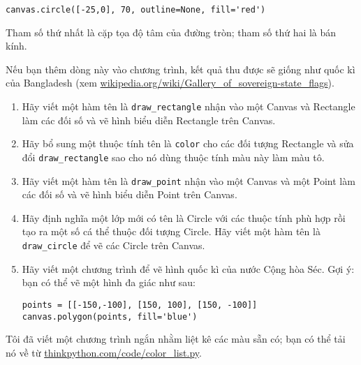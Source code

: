 \documentclass[11pt]{book}
\begin{document}
\begin{ex}
\beforeverb
\begin{verbatim}
canvas.circle([-25,0], 70, outline=None, fill='red')
\end{verbatim}
\afterverb


Tham số thứ nhất là cặp tọa độ tâm của đường tròn;
tham số thứ hai là bán kính.

Nếu bạn thêm dòng này vào chương trình, kết quả thu được sẽ giống
như quốc kì của Bangladesh
(xem \url{wikipedia.org/wiki/Gallery_of_sovereign-state_flags}).

\begin{enumerate}

\item Hãy viết một hàm tên là \verb"draw_rectangle" nhận vào một
  Canvas và Rectangle làm các đối số và vẽ hình biểu diễn
  Rectangle trên Canvas.

\item Hãy bổ sung một thuộc tính tên là {\tt color} cho các đối tượng Rectangle và
  sửa đổi \verb"draw_rectangle" sao cho nó dùng thuộc tính màu này làm màu tô.

\item Hãy viết một hàm tên là \verb"draw_point" nhận vào một 
  Canvas và một Point làm các đối số và vẽ hình biểu diễn
  Point trên Canvas.

\item Hãy định nghĩa một lớp mới có tên là Circle với các thuộc tính phù hợp rồi
  tạo ra một số cá thể thuộc đối tượng Circle. Hãy viết một hàm tên là
  \verb"draw_circle" để vẽ các Circle trên Canvas.


\item Hãy viết một chương trình để vẽ hình quốc kì của nước Cộng hòa Séc.
  Gợi ý: bạn có thể vẽ một hình đa giác như sau:

\beforeverb
\begin{verbatim}
points = [[-150,-100], [150, 100], [150, -100]]
canvas.polygon(points, fill='blue')
\end{verbatim}
\afterverb

\end{enumerate}


Tôi đã viết một chương trình ngắn nhằm liệt kê các màu sẵn có; 
bạn có thể tải nó về từ \url{thinkpython.com/code/color_list.py}.

\end{ex}
\end{document}
